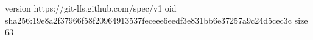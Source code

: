 version https://git-lfs.github.com/spec/v1
oid sha256:19e8a2f37966f58f20964913537feceee6eedf3e831bb6e37257a9c24d5cec3c
size 63
